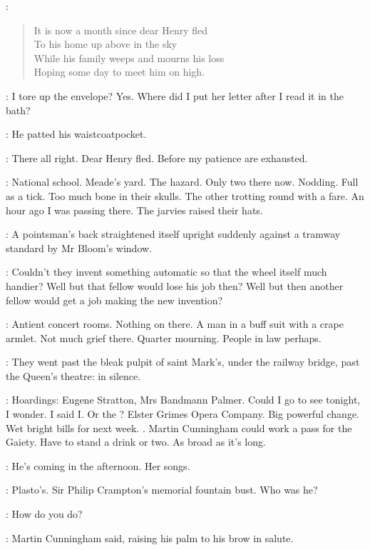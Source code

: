 :
\begin{verse}
    It is now a month since dear Henry fled \\
    To his home up above in the sky \\
    While his family weeps and mourns his loss \\
    Hoping some day to meet him on high.
\end{verse}

\BloomInt:
I tore up the envelope?
Yes.
Where did I put her letter after I read it in the bath?

:
He patted his waistcoatpocket.

\BloomInt:
There all right.
Dear Henry fled.
Before my patience
are exhausted.

\BloomInt:
National school.
Meade's yard.
The hazard.
Only two there now.
Nodding.
Full as a tick.
Too much bone in their skulls.
The other trotting round with a fare.
An hour ago I was passing there.
The jarvies raised their hats.

:
A pointsman's back straightened itself upright
suddenly against a tramway standard
by Mr Bloom's window.

\BloomInt:
Couldn't they invent something automatic so that the wheel itself much handier?
Well but that fellow would lose his job then?
Well but then another fellow would get a job making the new invention?

\BloomInt:
Antient concert rooms.
Nothing on there.
A man in a buff suit with a crape armlet.
Not much grief there.
Quarter mourning.
People in law perhaps.

:
They went past the bleak pulpit of saint Mark's,
under the railway bridge,
past the Queen's theatre:
in silence.

\BloomInt:
Hoardings:
Eugene Stratton,
Mrs Bandmann Palmer.
Could I go to see  tonight, I wonder.
I said I.
Or the ?
Elster Grimes Opera Company.
Big powerful change.
Wet bright bills for next week.
.
Martin Cunningham could work a pass for the Gaiety.
Have to stand a drink or two.
As broad as it's long.

\BloomInt:
He's coming in the afternoon.
Her songs.

\BloomInt:
Plasto's.
Sir Philip Crampton's memorial fountain bust.
Who was he?

\cunningham:
How do you do?

:
Martin Cunningham said,
raising his palm to his brow in salute.

